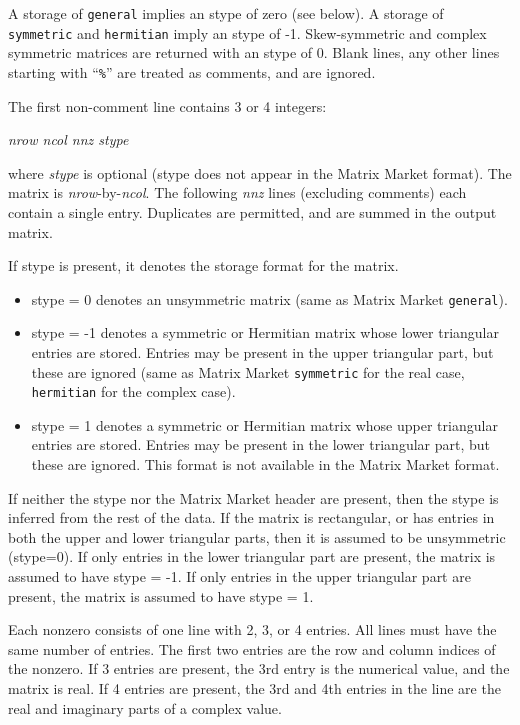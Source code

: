 \documentclass[11pt]{article}
\begin{document}
A storage of {\tt general} implies an stype of zero (see below).  A storage of
{\tt symmetric} and {\tt hermitian} imply an stype of -1.  Skew-symmetric and
complex symmetric matrices are returned with an stype of 0.  Blank lines, any
other lines starting with ``{\tt \%}'' are treated as comments, and are
ignored.

The first non-comment line contains 3 or 4 integers:
\vspace{0.1in}

        {\em nrow ncol nnz stype}

\vspace{0.1in}
\noindent
where {\em stype} is optional (stype does not appear in the Matrix Market
format).  The matrix is {\em nrow}-by-{\em ncol}.  The following {\em nnz}
lines (excluding comments) each contain a single entry.  Duplicates are
permitted, and are summed in the output matrix.

If stype is present, it denotes the storage format for the matrix.
\begin{itemize}
\item stype = 0 denotes an unsymmetric matrix (same as Matrix Market {\tt general}).
\item stype = -1 denotes a symmetric or Hermitian matrix whose lower triangular
        entries are stored.  Entries may be present in the upper triangular
        part, but these are ignored (same as Matrix Market {\tt symmetric}
        for the real case, {\tt hermitian} for the complex case).
\item stype = 1 denotes a symmetric or Hermitian matrix whose upper triangular
        entries are stored.  Entries may be present in the lower triangular
        part, but these are ignored.  This format is not available in the Matrix
        Market format.
\end{itemize}

If neither the stype nor the Matrix Market header are present, then the stype
is inferred from the rest of the data.  If the matrix is rectangular, or has
entries in both the upper and lower triangular parts, then it is assumed to be
unsymmetric (stype=0).  If only entries in the lower triangular part are
present, the matrix is assumed to have stype = -1.  If only entries in the
upper triangular part are present, the matrix is assumed to have stype = 1.

Each nonzero consists of one line with 2, 3, or 4 entries.  All lines must have
the same number of entries.  The first two entries are the row and column
indices of the nonzero.  If 3 entries are present, the 3rd entry is the
numerical value, and the matrix is real.  If 4 entries are present, the 3rd and
4th entries in the line are the real and imaginary parts of a complex value.
\end{document}
